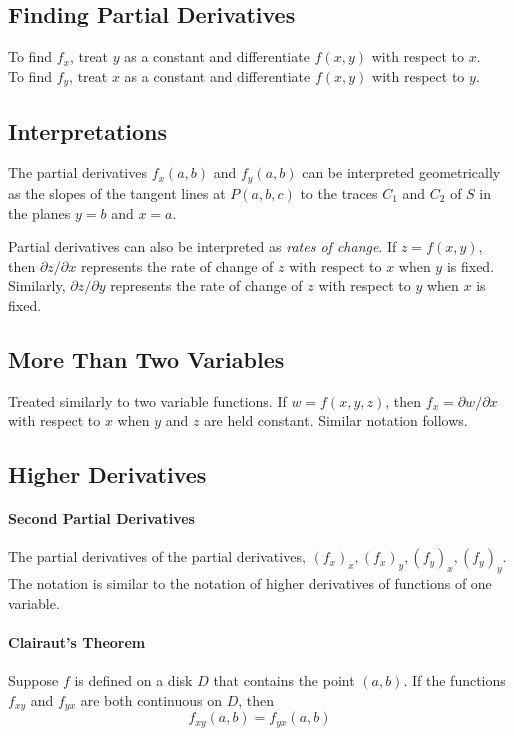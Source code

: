 \documentclass{report}  %
\begin{document}
\subsection*{Finding Partial Derivatives}
To find $f_x$, treat $y$ as a constant and differentiate $f(x, y)$ with respect to $x$. \\
To find $f_y$, treat $x$ as a constant and differentiate $f(x, y)$ with respect to $y$.

\subsection*{Interpretations}
The partial derivatives $f_x(a, b)$ and $f_y(a, b)$ can be interpreted geometrically as the slopes of the tangent lines at $P(a, b, c)$ to the traces $C_1$ and $C_2$ of $S$ in the planes $y=b$ and $x=a$. 

Partial derivatives can also be interpreted as \textit{rates of change}. If $z = f(x,y)$, then $\partial z / \partial x$ represents the rate of change of $z$ with respect to $x$ when $y$ is fixed. 
Similarly, $\partial z / \partial y$ represents the rate of change of $z$ with respect to $y$ when $x$ is fixed.

\subsection*{More Than Two Variables}
Treated similarly to two variable functions. If $w = f(x, y, z)$, then $f_x = \partial w / \partial x$ with respect to $x$ when $y$ and $z$ are held constant. Similar notation follows. 

\subsection*{Higher Derivatives}
\paragraph{Second Partial Derivatives} The partial derivatives of the partial derivatives, $(f_x)_x, (f_x)_y, (f_y)_x, (f_y)_y$. The notation is similar to the notation of higher derivatives of functions of one variable.

\paragraph{Clairaut's Theorem} Suppose $f$ is defined on a disk $D$ that contains the point $(a, b)$. If the functions $f_{xy}$ and $f_{yx}$ are both continuous on $D$, then 
\begin{equation}
	f_{xy}(a, b) = f_{yx}(a, b)
\end{equation}
\end{document}
